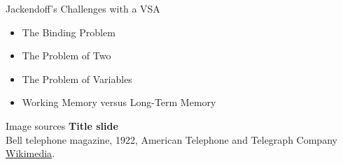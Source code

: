 \documentclass[handout,aspectratio=169]{beamer}
\begin{document}
  \begin{frame}{Jackendoff's Challenges with a VSA}
		\begin{itemize}
			\item The Binding Problem
			\item The Problem of Two
			\item The Problem of Variables
			\item Working Memory versus Long-Term Memory
		\end{itemize}
	\end{frame}

	\backupbegin

	\begin{frame}[noframenumbering]{Image sources}
		\small
		\textbf{Title slide}\\Bell telephone magazine, 1922,  American Telephone and Telegraph Company\\ \href{https://commons.wikimedia.org/wiki/File:Bell_telephone_magazine_(1922)_(14733423296).jpg}{Wikimedia}.
	\end{frame}

	\backupend
	
\end{document}
